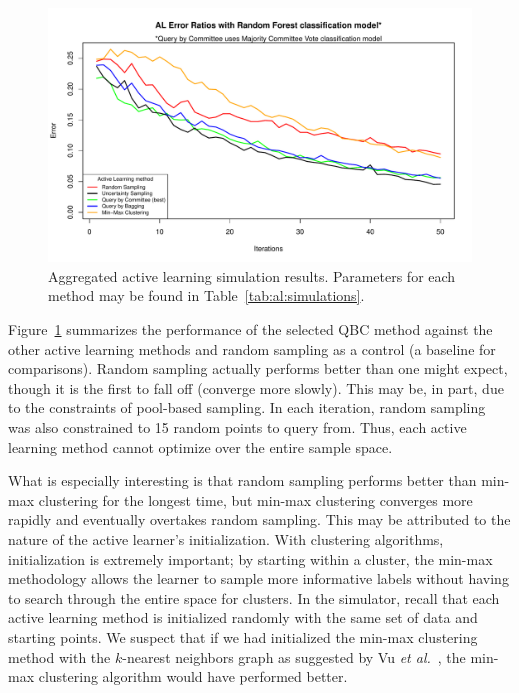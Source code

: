 \begin{figure}[htb]
	\begin{center}
		\includegraphics[width=1\linewidth,page=1]{ch-al/figures/results.pdf}
		\caption[Aggregated active learning simulation results.]{ 
		Aggregated active learning simulation results. Parameters for each 
		method may be found in Table~\ref{tab:al:simulations}.}
		\label{fig:al:simulations:results}
	\end{center}
\end{figure}

Figure~\ref{fig:al:simulations:results} summarizes the performance of the 
selected QBC method against the other active learning methods and random 
sampling as a control (a baseline for comparisons). Random sampling actually 
performs better than one might expect, though it is the first to fall off 
(converge more slowly). This may be, in part, due to the constraints of 
pool-based sampling. In each iteration, random sampling was also constrained to 
15 random points to query from. Thus, each active learning method cannot 
optimize over the entire sample space.

What is especially interesting is that random 
sampling performs better than min-max clustering for the longest time, but 
min-max clustering converges more rapidly and eventually overtakes random 
sampling. This may be attributed to the nature of the active learner's 
initialization. With clustering algorithms, initialization is extremely 
important; by starting within a cluster, the min-max methodology 
allows the learner to sample more informative labels 
without having to search through the entire space for clusters. 
In the simulator, recall that each active learning method is initialized 
randomly with the same set of data and starting points. We suspect that if we 
had initialized the min-max clustering method with the $k$-nearest neighbors 
graph as suggested by Vu \textit{et al.}~\cite{vu2010}, the min-max 
clustering algorithm would have performed better. 

